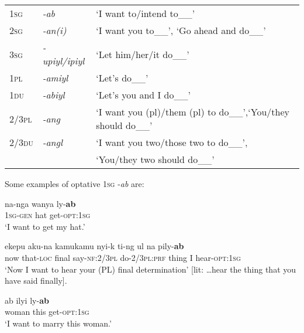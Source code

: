 \documentclass[output=paper]{langsci/langscibook}
\begin{document}
\begin{table}
\begin{tabularx}{\textwidth}{lll}
1\textsc{sg}	&	\textit{-ab} 	&	`I want to/intend to\_\_’	\\
2\textsc{sg}	&	\textit{-an(i)}  	&	`I want you to\_\_’, ‘Go ahead and do\_\_’	\\
3\textsc{sg}	&	\textit{-upiyl/ipiyl}	&	`Let him/her/it do\_\_’	\\
1\textsc{pl}	&	\textit{-amiyl}	&	`Let’s do\_\_’	\\
1\textsc{du}	&	\textit{-abiyl}	&	`Let’s you and I do\_\_’	\\
2/3\textsc{pl}	&	\textit{-ang}	&	`I want you (pl)/them (pl) to do\_\_’,\newline ‘You/they should do\_\_’	\\
2/3\textsc{du}	&	\textit{-angl}	&	`I want you two/those two to do\_\_’, \\
& & ‘You/they two should do\_\_’\\
\end{tabularx}
\end{table}

Some examples of optative 1\textsc{sg} -\textit{ab} are:

\begin{exe}
	\ex \label{ex:rumsey:ar7}
	\gll na-nga wanya ly-\textbf{ab}\\
	1\textsc{sg}-\textsc{gen} hat get-\textsc{opt}:1\textsc{sg}\\
	\trans ‘I want to get my hat.’
\end{exe}


\begin{exe}
	\ex \label{ex:rumsey:ar8}
	\gll ekepu aku-na kamukamu nyi-k ti-ng ul na pily-\textbf{ab}\\
	now	that-\textsc{loc} final say-\textsc{nf}:2/3\textsc{pl}	do-2/3\textsc{pl}:\textsc{prf} thing I hear-\textsc{opt}:1\textsc{sg}\\
	\trans ‘Now I want to hear your (PL) final determination’ [lit: …hear the thing that you have said finally].
\end{exe}

\begin{exe}
	\ex \label{ex:rumsey:ar9}
	\gll ab 	ilyi ly-\textbf{ab}\\
	woman	this  get-\textsc{opt}:1\textsc{sg}\\
	\trans ‘I want to marry this woman.’
\end{exe}
\end{document}
